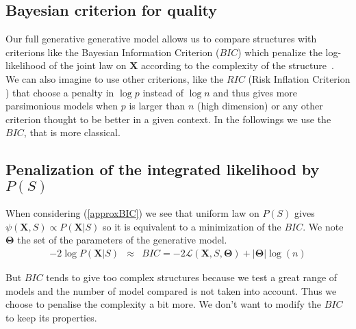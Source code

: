 \documentclass[12pt,a4paper]{report}
\begin{document}
			\subsection{Bayesian criterion for quality}
			
			
		Our full generative generative model allows us to compare structures with criterions like the Bayesian Information Criterion ($BIC$) which penalize the log-likelihood of the joint law on $\boldsymbol{X}$ according to the complexity of the structure~\cite{BIChuard}. \\
		
		
			 We can also imagine to use other criterions, like the $RIC$ (Risk Inflation Criterion \cite{foster1994risk}) that choose a penalty in $\log p$ instead of $\log n$ and thus gives more parsimonious models when $p$ is larger than $n$ (high dimension) or any other criterion \cite{george1993variable} thought to be better in a given context.
		In the followings we use the $BIC$, that is more classical.
		
		
		\subsection{Penalization of the integrated likelihood by $P(S)$} \label{compstruct}
		
		
When considering (\ref{approxBIC}) we see that uniform law on $P(S)$ gives $\psi(\boldsymbol{X},S)\propto P(\boldsymbol{X}|S)$ so it is equivalent to a minimization of the $BIC$.
	We note $\boldsymbol{\Theta}$ the set of the parameters of the generative model.
	\begin{eqnarray}
		-2\log P(\boldsymbol{X}|S)&\approx & BIC=-2\mathcal{L}(\boldsymbol{X},S,\boldsymbol{\Theta})+|\boldsymbol{\Theta}|\log(n)  
	\end{eqnarray}
	
	But $BIC$ tends to give too complex structures because we test a great range of models and the number of model compared is not taken into account\cite{massart2007concentration}. Thus we choose to penalise the complexity a bit more. We don't want to modify the $BIC$ to keep its properties.
	
\end{document}

